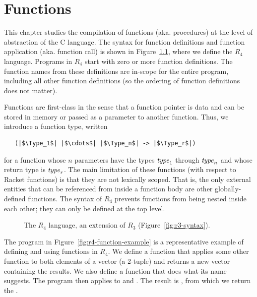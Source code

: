 \documentclass[11pt]{book}
\begin{document}
\chapter{Functions}
\label{ch:functions}

This chapter studies the compilation of functions (aka. procedures) at
the level of abstraction of the C language. The syntax for function
definitions and function application (aka. function call) is shown in
Figure~\ref{fig:r4-syntax}, where we define the $R_4$ language.
Programs in $R_4$ start with zero or more function definitions.  The
function names from these definitions are in-scope for the entire
program, including all other function definitions (so the ordering of
function definitions does not matter).

Functions are first-class in the sense that a function pointer is data
and can be stored in memory or passed as a parameter to another
function.  Thus, we introduce a function type, written
\begin{lstlisting}
   (|$\Type_1$| |$\cdots$| |$\Type_n$| -> |$\Type_r$|)
\end{lstlisting}
for a function whose $n$ parameters have the types $\mathit{type}_1$ through
$\mathit{type}_n$ and whose return type is $\mathit{type}_r$. The main limitation of
these functions (with respect to Racket functions) is that they are
not lexically scoped. That is, the only external entities that can be
referenced from inside a function body are other globally-defined
functions. The syntax of $R_4$ prevents functions from being nested
inside each other; they can only be defined at the top level.

\begin{figure}[tbp]
\centering
{}
\caption{The $R_4$ language, an extension of $R_3$
  (Figure~\ref{fig:r3-syntax}).}
\label{fig:r4-syntax}
\end{figure}

The program in Figure~\ref{fig:r4-function-example} is a
representative example of defining and using functions in $R_4$.  We
define a function  that applies some other function
 to both elements of a vector (a 2-tuple) and returns a new
vector containing the results. We also define a function 
that does what its name suggests. The program then applies
 to  and .  The result is
, from which we return the .
\end{document}
